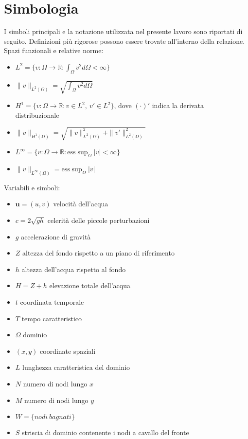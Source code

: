 \documentclass[a4paper,12pt,oneside]{book}
\theoremstyle{definition}
\begin{document}
\chapter{Simbologia}
I simboli principali e la notazione utilizzata nel presente lavoro sono riportati di seguito. Definizioni pi\`u rigorose possono essere trovate all'interno della relazione.\\
Spazi funzionali e relative norme:
\begin{itemize}
\item[] $L^2=\{ v: \Omega \rightarrow \mathds{R}: \int_\Omega{v^2 d\Omega}<\infty\}$
\item[] $\| v \|_{L^2(\Omega)}=\sqrt{ \int_\Omega{v^2 d\Omega}}$
\item[] $H^1=\{ v: \Omega \rightarrow \mathds{R}: v\in L^2,\ v'\in L^2\}$, dove $(\cdot) '$ indica la derivata distribuzionale
\item[] $\| v \|_{H^1(\Omega)}=\sqrt{\| v \|_{L^2(\Omega)}^2+\| v' \|_{L^2(\Omega)}^2}$
\item[] $L^\infty=\{ v: \Omega \rightarrow \mathds{R}: \text{ess}\sup_\Omega{|v|}<\infty\}$
\item[] $\| v \|_{L^\infty(\Omega)}=\text{ess}\sup_\Omega{|v|}$
\end{itemize}
Variabili e simboli:
\begin{itemize}
\item[]$\mathbf u=(u,v)$ velocit\`a dell'acqua
\item[]$c=2\sqrt{gh}$ celerit\`a delle piccole perturbazioni
\item[]$g$ accelerazione di gravit\`a
\item[]$Z$ altezza del fondo rispetto a un piano di riferimento
\item[]$h$ altezza dell'acqua rispetto al fondo
\item[]$H = Z + h$  elevazione totale dell'acqua
\item[]$t$ coordinata temporale
\item[]$T$ tempo caratteristico
\item[]$\Omega$ dominio
\item[]$(x,y)$ coordinate spaziali
\item[]$L$ lunghezza caratteristica del dominio
\item[]$N$ numero di nodi lungo $x$
\item[]$M$ numero di nodi lungo $y$
\item[]$W=\{nodi\ bagnati\}$
\item[]$S$ striscia di dominio contenente i nodi a cavallo del fronte

\end{itemize}
\end{document}
